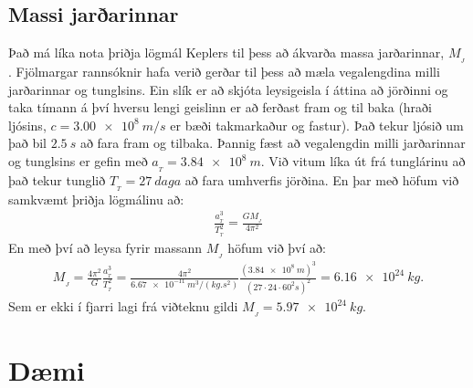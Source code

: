 \ifdefined \wholebook \else\documentclass[oneside]{book}\usepackage{EdlBook}\graphicspath{{figures/}}
\begin{document}
\subsection*{Massi jarðarinnar}

Það má líka nota þriðja lögmál Keplers til þess að ákvarða massa jarðarinnar, $M_{_J}$. Fjölmargar rannsóknir hafa verið gerðar til þess að mæla vegalengdina milli jarðarinnar og tunglsins. Ein slík er að skjóta leysigeisla í áttina að jörðinni og taka tímann á því hversu lengi geislinn er að ferðast fram og til baka (hraði ljósins, $c = \SI{3.00e8}{m/s}$ er bæði takmarkaður og fastur). Það tekur ljósið um það bil $\SI{2.5}{s}$ að fara fram og tilbaka. Þannig fæst að vegalengdin milli jarðarinnar og tunglsins er gefin með $a_{_{T}} = \SI{3.84e8}{m}$. Við vitum líka út frá tunglárinu að það tekur tunglið $T_{_{T}} = \SI{27}{daga}$ að fara umhverfis jörðina. En þar með höfum við samkvæmt þriðja lögmálinu að:
\begin{align*}
    \frac{a_{_T}^3}{T_{_{T}}^2} = \frac{GM_{_J}}{4\pi^2}
\end{align*}
En með því að leysa fyrir massann $M_{_J}$ höfum við því að:
\begin{align*}
    M_{_{J}} = \frac{4\pi^2}{G} \frac{a_{_T}^3}{T_{_{T}}^2} = \frac{4\pi^2}{\SI{6.67e-11}{m^3/(kg.s^2)}} \frac{(\SI{3.84e8}{m})^3}{(27 \cdot 24 \cdot 60^2 \si{s})^2} = \SI{6.16e24}{kg}.
\end{align*}
Sem er ekki í fjarri lagi frá viðteknu gildi $M_{_J} = \SI{5.97e24}{kg}$.

\newpage

\section{Dæmi}
\end{document}
